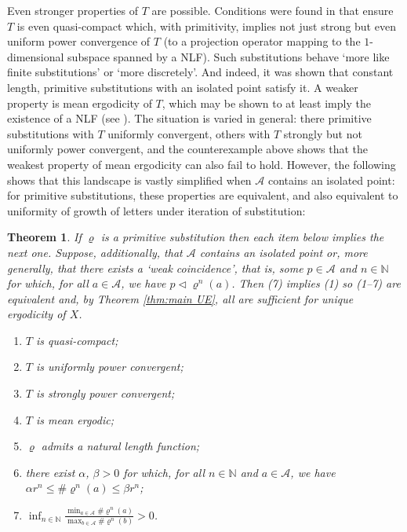 \documentclass[11pt]{amsart}
\numberwithin{equation}{section}
\theoremstyle{plain}
\newtheorem{theorem}{Theorem}[section]
\theoremstyle{definition}
\newcommand{\N}{{\mathbb N}}
\newcommand{\mc}{\mathcal}
\newcommand{\A}{\mc A}
\newcommand{\sub}{\varrho}
\begin{document}
Even stronger properties of \(T\) are possible. Conditions were found in \cite{MRW25} that ensure \(T\) is even quasi-compact which, with primitivity, implies not just strong but even uniform power convergence of \(T\) (to a projection operator mapping to the \(1\)-dimensional subspace spanned by a NLF). Such substitutions behave `more like finite substitutions' or `more discretely'. And indeed, it was shown that constant length, primitive substitutions with an isolated point satisfy it. A weaker property is mean ergodicity of \(T\), which may be shown to at least imply the existence of a NLF (see \cite[Section 5]{MRW25}). The situation is varied in general: there primitive substitutions with \(T\) uniformly convergent, others with \(T\) strongly but not uniformly power convergent, and the counterexample above shows that the weakest property of mean ergodicity can also fail to hold. However, the following shows that this landscape is vastly simplified when \(\A\) contains an isolated point: for primitive substitutions, these properties are equivalent, and also equivalent to uniformity of growth of letters under iteration of substitution:

\begin{samepage}
\begin{theorem}\label{thm:equivalence of operator conditions}
If \(\sub\) is a primitive substitution then each item below implies the next one. Suppose, additionally, that \(\A\) contains an isolated point or, more generally, that there exists a `weak coincidence', that is, some \(p \in \A\) and \(n \in \N\) for which, for all \(a \in \A\), we have \(p \triangleleft \sub^n(a)\). Then (7) implies (1) so (1--7) are equivalent and, by Theorem \ref{thm:main UE}, all are sufficient for unique ergodicity of \(X\).
\begin{enumerate}
	\item \(T\) is quasi-compact;
	\item \(T\) is uniformly power convergent;
	\item \(T\) is strongly power convergent;
	\item \(T\) is mean ergodic;
	\item \(\sub\) admits a natural length function;
	\item there exist \(\alpha\), \(\beta > 0\) for which, for all \(n \in \N\) and \(a \in \A\), we have \(\alpha r^n \leq \# \sub^n(a) \leq \beta r^n\);
	\item \(\displaystyle \inf_{n \in \N} \frac{ \min_{a \in \A} \# \sub^n(a) }{ \max_{b \in \A} \# \sub^n(b) } > 0\).
\end{enumerate}
\end{theorem}
\end{samepage}
\end{document}
